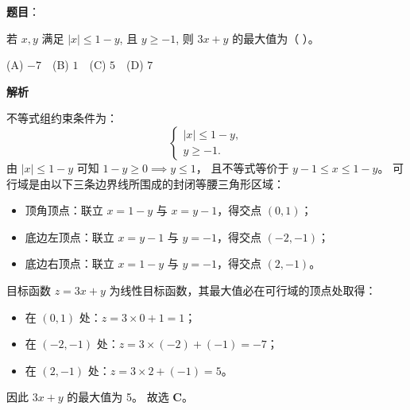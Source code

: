 \begin{answer}

\textbf{题目}：

若 $x, y$ 满足 $|x| \leqslant 1 - y$, 且 $y \geqslant -1$, 则 $3x + y$ 的最大值为（ ）。

(A) $-7$　(B) $1$　(C) $5$　(D) $7$

\textbf{解析}

不等式组约束条件为：
\nopagebreak[4]
\[\begin{cases} |x| \leqslant 1 - y, \\ y \geqslant -1. \end{cases}\]
由 $|x| \leqslant 1 - y$ 可知 $1 - y \geqslant 0 \implies y \leqslant 1$，
且不等式等价于 $y - 1 \leqslant x \leqslant 1 - y$。
可行域是由以下三条边界线所围成的封闭等腰三角形区域：
\begin{itemize}
\item 顶角顶点：联立 $x = 1 - y$ 与 $x = y - 1$，得交点 $(0, 1)$；
\item 底边左顶点：联立 $x = y - 1$ 与 $y = -1$，得交点 $(-2, -1)$；
\item 底边右顶点：联立 $x = 1 - y$ 与 $y = -1$，得交点 $(2, -1)$。
\end{itemize}
目标函数 $z = 3x + y$ 为线性目标函数，其最大值必在可行域的顶点处取得：
\begin{itemize}
\item 在 $(0, 1)$ 处：$z = 3 \times 0 + 1 = 1$；
\item 在 $(-2, -1)$ 处：$z = 3 \times (-2) + (-1) = -7$；
\item 在 $(2, -1)$ 处：$z = 3 \times 2 + (-1) = 5$。
\end{itemize}
因此 $3x + y$ 的最大值为 5。
故选 \textbf{C}。


\end{answer}
